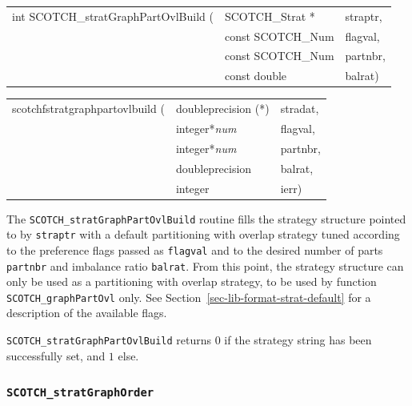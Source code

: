 \begin{itemize}
\progsyn

{\tt\begin{tabular}{l@{}ll}
int SCOTCH\_stratGraphPartOvlBuild ( & SCOTCH\_Strat *   & straptr, \\
                                     & const SCOTCH\_Num & flagval, \\
                                     & const SCOTCH\_Num & partnbr, \\
                                     & const double      & balrat)
\end{tabular}}

{\tt\begin{tabular}{l@{}ll}
scotchfstratgraphpartovlbuild ( & doubleprecision (*) & stradat, \\
                                & integer*{\it num}   & flagval, \\
                                & integer*{\it num}   & partnbr, \\
                                & doubleprecision     & balrat,  \\
                                & integer             & ierr)
\end{tabular}}

\progdes

The {\tt SCOTCH\_stratGraphPartOvlBuild} routine fills the strategy
structure pointed to by {\tt straptr} with a default partitioning with
overlap strategy tuned according to the preference flags passed as
{\tt flagval} and to the desired number of parts {\tt partnbr} and
imbalance ratio {\tt balrat}. From this point, the strategy structure
can only be used as a partitioning with overlap strategy, to be used
by function {\tt SCOTCH\_\lbt graph\lbt Part\lbt Ovl} only. See
Section~\ref{sec-lib-format-strat-default} for a description of the
available flags.

\progret

{\tt SCOTCH\_stratGraphPartOvlBuild} returns $0$ if the strategy string
has been successfully set, and $1$ else.
\end{itemize}

\subsubsection{{\tt SCOTCH\_stratGraphOrder}}

